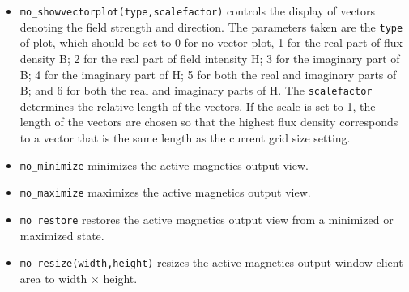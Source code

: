 \begin{itemize}
        \begin{itemize}
        \item{\tt numcontours} Number of $A$ equipotential lines
        to be plotted.
        \item{\verb+upper_A+} Upper limit for $A$ contours.
        \item{\verb+lower_A+} Lower limit for $A$ contours.
                \item{\verb+type+} Choice of {\tt "real"}, {\tt "imag"}, or {\tt "both"}
                        to show either the real, imaginary of both real and imaginary components of A.
        \end{itemize}
        If {\tt numcontours} is {\tt -1} all parameters are ignored and default
        values are used, {\em e.g.}: \\ \verb+mo_showcontourplot(-1)+

\item{\tt mo\_showvectorplot(type,scalefactor)}
controls the display of vectors denoting the field strength and
direction. The parameters taken are the \texttt{type} of plot,
which should be set to 0 for no vector plot,  1 for the real part of flux density B;
2 for the real part of field intensity H; 3 for the imaginary part of B;
4 for the imaginary part of H; 5 for both the real and imaginary parts of B;
and 6 for both the real and imaginary parts of H. The \texttt{scalefactor}
determines the relative length of the vectors. If the scale is set
to 1, the length of the vectors are chosen so that the highest flux
density corresponds to a vector that is the same length as the
current grid size setting.


\item{\tt mo\_minimize} minimizes the active magnetics output view.
\item{\tt mo\_maximize} maximizes the active magnetics output view.
\item{\tt mo\_restore} restores the active magnetics output view from a
 minimized or maximized state.
\item{\tt mo\_resize(width,height)} resizes the active magnetics output
 window client area to width $\times$ height.
\end{itemize}

